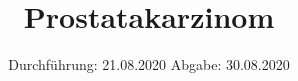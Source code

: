 

\subject{TPS Praktikum}
\title{Prostatakarzinom}
\date{%
	Durchführung: 21.08.2020
	\hspace{3em}
	Abgabe: 30.08.2020
}



\maketitle
\thispagestyle{empty}
\tableofcontents
\newpage






\printbibliography{}


